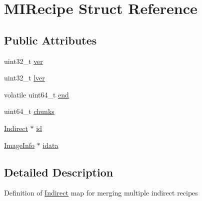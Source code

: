 \hypertarget{structMIRecipe}{\section{\-M\-I\-Recipe \-Struct \-Reference}
\label{structMIRecipe}
}
\subsection*{\-Public \-Attributes}
\begin{DoxyCompactItemize}
\item 
uint32\-\_\-t \hyperlink{structMIRecipe_abcf9aa1e0106d8594ed734412df447b1}{ver}
\item 
uint32\-\_\-t \hyperlink{structMIRecipe_a1bce899fd90f5b324e5dfa3f18039c1f}{lver}
\item 
volatile uint64\-\_\-t \hyperlink{structMIRecipe_ad3dfe2624c87fd6211cc777c064f4b94}{end}
\item 
uint64\-\_\-t \hyperlink{structMIRecipe_a63a2515abe1efe6c2aa210929f70cd7d}{chunks}
\item 
\hyperlink{structIndirect}{\-Indirect} $\ast$ \hyperlink{structMIRecipe_afe805781e4f337606cc355cdf8caf98d}{id}
\item 
\hyperlink{structImageInfo}{\-Image\-Info} $\ast$ \hyperlink{structMIRecipe_a57c566e7e9c4b3e0f4001712a57ef280}{idata}
\end{DoxyCompactItemize}


\subsection{\-Detailed \-Description}
\-Definition of \hyperlink{structIndirect}{\-Indirect} map for merging multiple indirect recipes 


